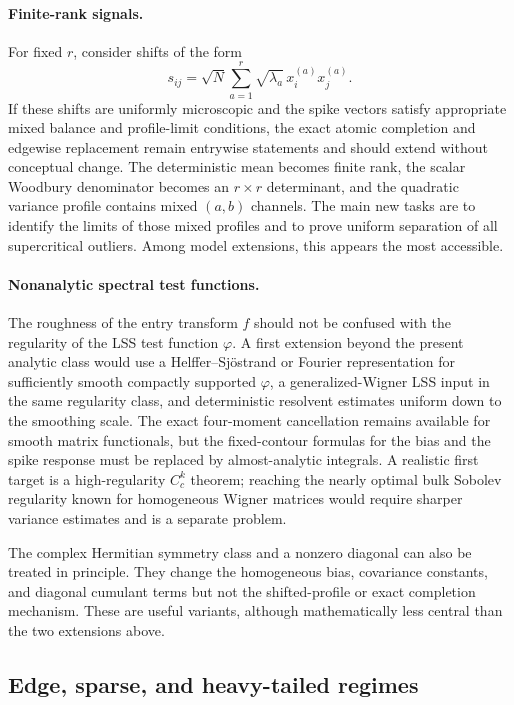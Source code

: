 \documentclass[10pt,a4paper]{amsart}
\begin{document}
\paragraph*{Finite-rank signals.}
For fixed $r$, consider shifts of the form
\[
 s_{ij}=\sqrt N\sum_{a=1}^r\sqrt{\lambda_a}\,
 x_i^{(a)}x_j^{(a)}.
\]
If these shifts are uniformly microscopic and the spike vectors satisfy
appropriate mixed balance and profile-limit conditions, the exact atomic
completion and edgewise replacement remain entrywise statements and should
extend without conceptual change.  The deterministic mean becomes finite
rank, the scalar Woodbury denominator becomes an $r\times r$ determinant,
and the quadratic variance profile contains mixed $(a,b)$ channels.  The main
new tasks are to identify the limits of those mixed profiles and to prove
uniform separation of all supercritical outliers.  Among model extensions,
this appears the most accessible.

\paragraph*{Nonanalytic spectral test functions.}
The roughness of the entry transform $f$ should not be confused with the
regularity of the LSS test function $\varphi$.  A first extension beyond the
present analytic class would use a Helffer--Sj\"ostrand or Fourier
representation for sufficiently smooth compactly supported $\varphi$, a
generalized-Wigner LSS input in the same regularity class, and deterministic
resolvent estimates uniform down to the smoothing scale.  The exact
four-moment cancellation remains available for smooth matrix functionals,
but the fixed-contour formulas for the bias and the spike response must be
replaced by almost-analytic integrals.  A realistic first target is a
high-regularity $C_c^k$ theorem; reaching the nearly optimal bulk Sobolev
regularity known for homogeneous Wigner matrices would require sharper
variance estimates and is a separate problem.

The complex Hermitian symmetry class and a nonzero diagonal can also be
treated in principle.  They change the homogeneous bias, covariance
constants, and diagonal cumulant terms but not the shifted-profile or exact
completion mechanism.  These are useful variants, although mathematically
less central than the two extensions above.

\subsection{Edge, sparse, and heavy-tailed regimes}
\label{subsec:discussion-frontiers}
\end{document}
